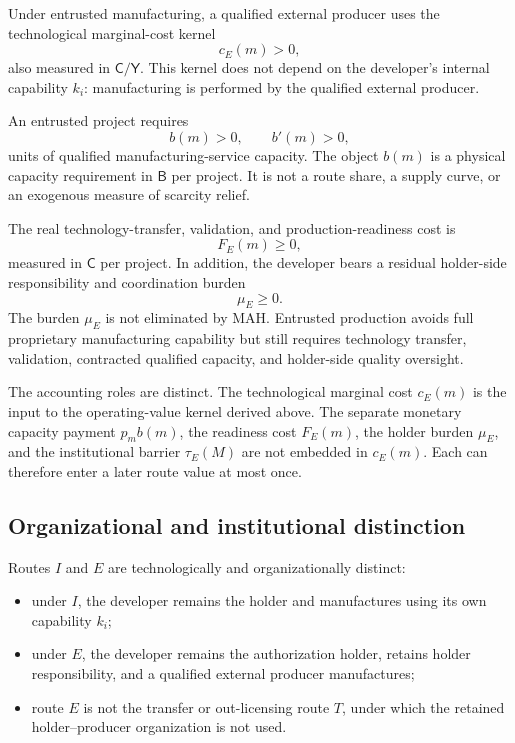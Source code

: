 Under entrusted manufacturing, a qualified external producer uses the
technological marginal-cost kernel
\begin{equation}
  c_E(m)>0,
  \label{eq:p03-external-cost}
\end{equation}
also measured in \(\mathsf C/\mathsf Y\). This kernel does not depend on the
developer's internal capability \(k_i\): manufacturing is performed by the
qualified external producer.

An entrusted project requires
\begin{equation}
  b(m)>0,
  \qquad b'(m)>0,
  \label{eq:p03-capacity-requirement}
\end{equation}
units of qualified manufacturing-service capacity. The object \(b(m)\) is a
physical capacity requirement in \(\mathsf B\) per project. It is not a route
share, a supply curve, or an exogenous measure of scarcity relief.

The real technology-transfer, validation, and production-readiness cost is
\begin{equation}
  F_E(m)\geq0,
  \label{eq:p03-external-fixed-cost}
\end{equation}
measured in \(\mathsf C\) per project. In addition, the developer bears a
residual holder-side responsibility and coordination burden
\begin{equation}
  \mu_E\geq0.
  \label{eq:p03-holder-burden}
\end{equation}
The burden \(\mu_E\) is not eliminated by MAH. Entrusted production avoids
full proprietary manufacturing capability but still requires technology
transfer, validation, contracted qualified capacity, and holder-side quality
oversight.

The accounting roles are distinct. The technological marginal cost \(c_E(m)\)
is the input to the operating-value kernel derived above. The separate
monetary capacity payment \(p_m b(m)\), the readiness cost \(F_E(m)\), the
holder burden \(\mu_E\), and the institutional barrier \(\tau_E(M)\) are not
embedded in \(c_E(m)\). Each can therefore enter a later route value at most
once.

\subsection{Organizational and institutional distinction}
\label{subsec:p03-organization}

Routes \(I\) and \(E\) are technologically and organizationally distinct:
\begin{itemize}
  \item under \(I\), the developer remains the holder and manufactures using
  its own capability \(k_i\);
  \item under \(E\), the developer remains the authorization holder, retains
  holder responsibility, and a qualified external producer manufactures;
  \item route \(E\) is not the transfer or out-licensing route \(T\), under
  which the retained holder--producer organization is not used.
\end{itemize}

